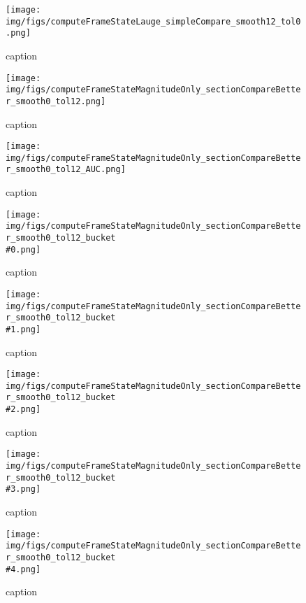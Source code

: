 %
\begin{figure}[!ht]
	\centering
	\texttt{[image: img/figs/computeFrameStateLauge\_simpleCompare\_smooth12\_tol0.png]}
	\caption{caption}
	\label{fig:computeFrameStateLauge_simpleCompare_smooth12_tol0.png}
\end{figure}
%
\begin{figure}[!ht]
	\centering
	\texttt{[image: img/figs/computeFrameStateMagnitudeOnly\_sectionCompareBetter\_smooth0\_tol12.png]}
	\caption{caption}
	\label{fig:computeFrameStateMagnitudeOnly_sectionCompareBetter_smooth0_tol12.png}
\end{figure}
%
\begin{figure}[!ht]
	\centering
	\texttt{[image: img/figs/computeFrameStateMagnitudeOnly\_sectionCompareBetter\_smooth0\_tol12\_AUC.png]}
	\caption{caption}
	\label{fig:computeFrameStateMagnitudeOnly_sectionCompareBetter_smooth0_tol12_AUC.png}
\end{figure}
%
\begin{figure}[!ht]
	\centering
	\texttt{[image: img/figs/computeFrameStateMagnitudeOnly\_sectionCompareBetter\_smooth0\_tol12\_bucket\\\#0.png]}
	\caption{caption}
	\label{fig:computeFrameStateMagnitudeOnly_sectionCompareBetter_smooth0_tol12_bucket\#0.png}
\end{figure}
%
\begin{figure}[!ht]
	\centering
	\texttt{[image: img/figs/computeFrameStateMagnitudeOnly\_sectionCompareBetter\_smooth0\_tol12\_bucket\\\#1.png]}
	\caption{caption}
	\label{fig:computeFrameStateMagnitudeOnly_sectionCompareBetter_smooth0_tol12_bucket\#1.png}
\end{figure}
%
\begin{figure}[!ht]
	\centering
	\texttt{[image: img/figs/computeFrameStateMagnitudeOnly\_sectionCompareBetter\_smooth0\_tol12\_bucket\\\#2.png]}
	\caption{caption}
	\label{fig:computeFrameStateMagnitudeOnly_sectionCompareBetter_smooth0_tol12_bucket\#2.png}
\end{figure}
%
\begin{figure}[!ht]
	\centering
	\texttt{[image: img/figs/computeFrameStateMagnitudeOnly\_sectionCompareBetter\_smooth0\_tol12\_bucket\\\#3.png]}
	\caption{caption}
	\label{fig:computeFrameStateMagnitudeOnly_sectionCompareBetter_smooth0_tol12_bucket\#3.png}
\end{figure}
%
\begin{figure}[!ht]
	\centering
	\texttt{[image: img/figs/computeFrameStateMagnitudeOnly\_sectionCompareBetter\_smooth0\_tol12\_bucket\\\#4.png]}
	\caption{caption}
	\label{fig:computeFrameStateMagnitudeOnly_sectionCompareBetter_smooth0_tol12_bucket\#4.png}
\end{figure}

